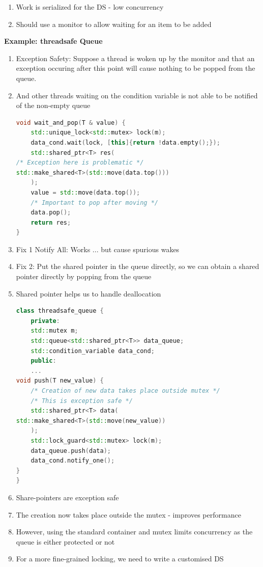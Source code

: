 \documentclass[10pt, landscape]{article}
\begin{document}
\begin{multicols}{4}
\begin{enumerate}
    \item Work is serialized for the DS - low concurrency
    \item Should use a monitor to allow waiting for an item to be added
\end{enumerate}

\textbf{Example: threadsafe Queue} \\
\begin{enumerate}
    \item Exception Safety: Suppose a thread is woken up by the monitor and that an exception occuring after this point will cause nothing to be popped from the queue.
    \item And other threads waiting on the condition variable is not able to be notified of the non-empty queue
    \begin{lstlisting}[language=C++, breaklines=true, breakatwhitespace=true]
void wait_and_pop(T & value) {
    std::unique_lock<std::mutex> lock(m);
    data_cond.wait(lock, [this]{return !data.empty();});
    std::shared_ptr<T> res(
/* Exception here is problematic */
std::make_shared<T>(std::move(data.top()))
    );
    value = std::move(data.top());
    /* Important to pop after moving */
    data.pop();
    return res;
}
    \end{lstlisting}
\item Fix 1 Notify All: Works ... but cause spurious wakes 
\item Fix 2: Put the shared pointer in the queue directly, so we can obtain a shared pointer directly by popping from the queue
\item Shared pointer helps us to handle deallocation

\begin{lstlisting}[language=C++, breaklines=true, breakatwhitespace=true]
class threadsafe_queue {
    private:
    std::mutex m;
    std::queue<std::shared_ptr<T>> data_queue;
    std::condition_variable data_cond;
    public:
    ... 
void push(T new_value) {
    /* Creation of new data takes place outside mutex */
    /* This is exception safe */
    std::shared_ptr<T> data(
std::make_shared<T>(std::move(new_value))
    );
    std::lock_guard<std::mutex> lock(m);
    data_queue.push(data);
    data_cond.notify_one();
}
}
        \end{lstlisting}
\item Share-pointers are exception safe
\item The creation now takes place outside the mutex - improves performance 
\item However, using the standard container and mutex limits concurrency as the queue is either protected or not 
\item For a more fine-grained locking, we need to write a customised DS
\end{enumerate}


\end{multicols}
\end{document}
